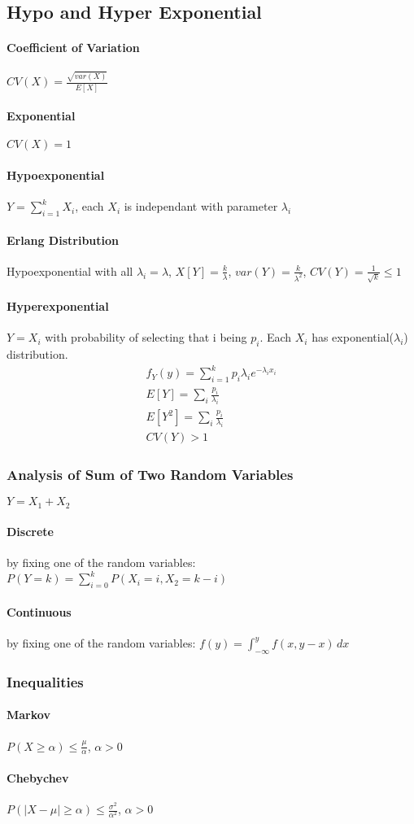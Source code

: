 \subsection{Hypo and Hyper Exponential}
\paragraph{Coefficient of Variation}
$CV(X) = \frac{\sqrt{var(X)}}{E[X]}$
\paragraph{Exponential} $CV(X) = 1$
\paragraph{Hypoexponential} $Y=\sum_{i=1}^k X_i$, each $X_i$ is independant with
parameter $\lambda_i$
\paragraph{Erlang Distribution} Hypoexponential with all $\lambda_i = \lambda$,
$X[Y] = \frac{k}{\lambda}$, 
$var(Y) = \frac{k}{\lambda^2}$, 
$CV(Y) = \frac{1}{\sqrt{k}} \le 1$
\paragraph{Hyperexponential} $Y = X_i$ with probability of selecting that i
being $p_i$. Each $X_i$ has exponential($\lambda_i$) distribution.
\begin{align*}
	f_Y(y) = \sum_{i=1}^k p_i \lambda_i e^{-\lambda_i x_i} \\
	E[Y] = \sum_i \frac{p_i}{\lambda_i} \\
	E[Y^2] = \sum_i \frac{p_i}{\lambda_i} \\
	CV(Y) > 1
\end{align*}

\subsubsection{Analysis of Sum of Two Random Variables}
$Y = X_1 + X_2$
\paragraph{Discrete} by fixing one of the random variables:
$P(Y=k) = \sum_{i=0}^k P(X_i = i, X_2 = k-i)$
\paragraph{Continuous} by fixing one of the random variables:
$f(y) = \int_{-\infty}^y f(x,y-x) \, dx$


\subsubsection{Inequalities}
\paragraph{Markov}
$P(X \ge \alpha) \le \frac{\mu}{\alpha}$, $\alpha > 0$
\paragraph{Chebychev}
$P(|X-\mu| \ge \alpha) \le \frac{\sigma^2}{\alpha^2}$, $\alpha > 0$











